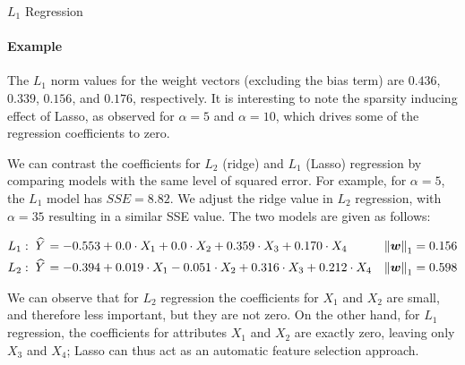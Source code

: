 \begin{frame}{$L_1$ Regression}
\framesubtitle{Example}

    The $L_1$ norm values for the weight vectors (excluding the bias term) are
    $0.436$, $0.339$, $0.156$, and $0.176$, respectively. 
    It is interesting to note the sparsity inducing effect of Lasso, as
    observed for $\alpha=5$ and $\alpha=10$, which drives some of the
    regression coefficients to zero. 

\medskip
    
    We can contrast the coefficients for $L_2$ (ridge)
    and $L_1$ (Lasso) regression by comparing models with the same level
    of squared error.
    For example, for $\alpha=5$, the $L_1$ model has $SSE = 8.82$.
    We adjust the ridge value in $L_2$ regression, with $\alpha=35$
    resulting in a similar SSE value. 
    The two models are given as follows:
\begin{small}
    \begin{align*}
        L_1:\; \mkern 1.5mu\widehat{\mkern-1.5muY}\mkern 1.5mu & = -0.553 + 0.0 \cdot X_1  + 0.0 \cdot X_2 + 
        0.359 \cdot X_3 + 0.170 \cdot X_4 & \left\lVert{\boldsymbol w}\right\rVert_1 = 0.156\\
        L_2:\; \mkern 1.5mu\widehat{\mkern-1.5muY}\mkern 1.5mu & = -0.394 + 0.019 \cdot X_1  - 0.051 \cdot X_2 + 
        0.316 \cdot X_3 + 0.212 \cdot X_4 & \left\lVert{\boldsymbol w}\right\rVert_1 = 0.598
    \end{align*}
\end{small}
    We can observe that for $L_2$
    regression the coefficients for $X_1$ and $X_2$ are small, and
    therefore less important, but 
    they are not zero. On the other hand, for $L_1$ regression, the
    coefficients for attributes $X_1$
    and $X_2$ are exactly zero, leaving only $X_3$ and $X_4$; 
    Lasso can thus act as an automatic feature selection approach.
    
\end{frame}
%
%
%
